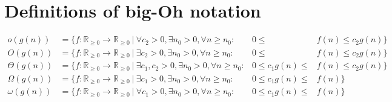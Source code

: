 \documentclass{ucalgthes1}
\theoremstyle{definition}
\newcommand{\RRgez}{\mathbb{R}_{\ge 0}}
\begin{document}
\section{Definitions of big-Oh notation}
\begin{align*}
o(g(n)) &= \{ f : \RRgez \rightarrow \RRgez ~|~ \forall c_2 > 0, \exists n_0 > 0, \forall n \ge n_0 :& 0 \le &f(n) \le c_2g(n) \} \\
O(g(n)) &= \{ f : \RRgez \rightarrow \RRgez ~|~ \exists c_2 > 0, \exists n_0 > 0, \forall n \ge n_0 :& 0 \le &f(n) \le c_2g(n) \} \\
\Theta(g(n)) &= \{ f : \RRgez \rightarrow \RRgez ~|~ \exists c_1, c_2 > 0, \exists n_0 > 0, \forall n \ge n_0 :& 0 \le c_1g(n) \le &f(n) \le c_2g(n) \} \\
\Omega(g(n)) &= \{ f : \RRgez \rightarrow \RRgez ~|~ \exists c_1 > 0, \exists n_0 > 0, \forall n \ge n_0 :& 0 \le c_1g(n) \le &f(n) \} \\
\omega(g(n)) &= \{ f : \RRgez \rightarrow \RRgez ~|~ \forall c_1 > 0, \exists n_0 > 0, \forall n \ge n_0 :& 0 \le c_1g(n) \le &f(n) \} 
\end{align*}




\end{document}
